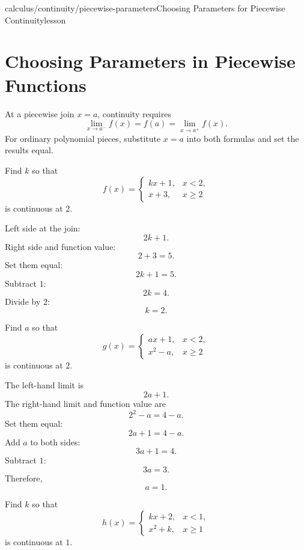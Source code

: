 \begin{webpage}{calculus/continuity/piecewise-parameters}{Choosing Parameters for Piecewise Continuity}{lesson}
\section{Choosing Parameters in Piecewise Functions}


At a piecewise join \(x=a\), continuity requires
\[
  \lim_{x\to a^-}f(x)
  =f(a)
  =\lim_{x\to a^+}f(x).
\]
For ordinary polynomial pieces, substitute \(x=a\) into both formulas and set the results equal.

\begin{bgguided}[title={One parameter}]
Find \(k\) so that
\[
  f(x)=
  \begin{cases}
    kx+1,&x<2,\\
    x+3,&x\ge2
  \end{cases}
\]
is continuous at \(2\).

\begin{bgsolution}
Left side at the join:
\[
  2k+1.
\]
Right side and function value:
\[
  2+3=5.
\]
Set them equal:
\[
  2k+1=5.
\]
Subtract \(1\):
\[
  2k=4.
\]
Divide by \(2\):
\[
  \boxed{k=2}.
\]
\end{bgsolution}
\end{bgguided}

\begin{bgexample}[title={The parameter appears in both pieces}]
Find \(a\) so that
\[
  g(x)=
  \begin{cases}
    ax+1,&x<2,\\
    x^2-a,&x\ge2
  \end{cases}
\]
is continuous at \(2\).

\begin{bgsolution}
The left-hand limit is
\[
  2a+1.
\]
The right-hand limit and function value are
\[
  2^2-a=4-a.
\]
Set them equal:
\[
  2a+1=4-a.
\]
Add \(a\) to both sides:
\[
  3a+1=4.
\]
Subtract \(1\):
\[
  3a=3.
\]
Therefore,
\[
  \boxed{a=1}.
\]
\end{bgsolution}
\end{bgexample}

\begin{bgexample}[title={Exam-level: no parameter works}]
Find \(k\) so that
\[
  h(x)=
  \begin{cases}
    kx+2,&x<1,\\
    x^2+k,&x\ge1
  \end{cases}
\]
is continuous at \(1\).


\end{bgexample}
\end{webpage}
